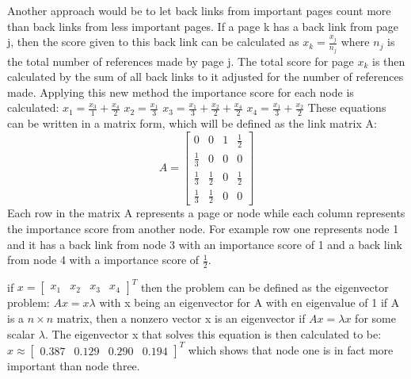 Another approach would be to let back links from important pages count more than back links from less important pages. If a page k has a back link from page j, then the score given to this back link can be calculated as $x_{k} = \frac{x_{j}}{n_{j}}$ where $n_{j}$ is the total number of references made by page j. The total score for page $x_{k}$ is then calculated by the sum of all back links to it adjusted for the number of references made. Applying this new method the importance score for each node is calculated:
\newline $x_{1} = \frac{x_{3}}{1} + \frac{x_{4}}{2} $ 
\newline $x_{2} = \frac{x_{1}}{3} $
\newline $x_{3} = \frac{x_{1}}{3} + \frac{x_{2}}{2} + \frac{x_{4}}{2} $
\newline $x_{4} = \frac{x_{1}}{3} + \frac{x_{2}}{2} $
\newline These equations can be written in a matrix form, which will be defined as the link matrix A:
\newline 
\[A=\begin{bmatrix}
0           & 0           & 1 & \frac{1}{2} \\
\frac{1}{3} & 0           & 0 & 0           \\
\frac{1}{3} & \frac{1}{2} & 0 & \frac{1}{2} \\
\frac{1}{3} & \frac{1}{2} & 0 & 0
\end{bmatrix}\]
\newline Each row in the matrix A represents a page or node while each column  represents the importance score from another node. For example row one represents node 1 and it has a back link from node 3 with an importance score of 1 and a back link from node 4 with a importance score of $\frac{1}{2}$.

if $x = \begin{bmatrix} x_{1} & x_{2} & x_{3} & x_{4} \end{bmatrix} ^{T}$ then the problem can be defined as the eigenvector problem:
\newline $Ax = x \lambda$ 
\newline with x being an eigenvector for A with en eigenvalue of 1
\newline if A is a $n\times n$ matrix, then a nonzero vector x is an eigenvector if $Ax = \lambda x$ for some scalar $\lambda$. The eigenvector x that solves this equation is then calculated to be:
\newline $x \approx \begin{bmatrix} 0.387 & 0.129 & 0.290 & 0.194\end{bmatrix}^{T}$
which shows that node one is in fact more important than node three.

